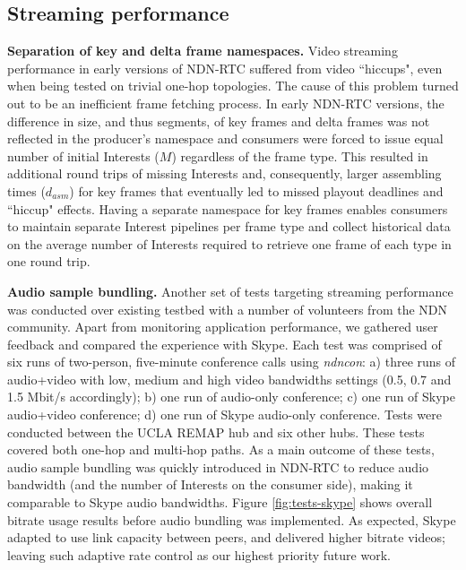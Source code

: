 \documentclass{icn/sig-alternate-2013} %
\newcommand{\ndnrtcName}{NDN-RTC} %
\newcommand{\ndnconName}{\emph{ndncon}}
\begin{document}
\subsection{Streaming performance}

\textbf{Separation of key and delta frame namespaces.} Video streaming performance in early versions of \ndnrtcName{} suffered from video ``hiccups", even when being tested on trivial one-hop topologies. The cause of this problem turned out to be an inefficient frame fetching process.
 In early \ndnrtcName{} versions, the difference in size, and thus segments, of key frames and delta frames was not reflected in the producer's namespace and consumers were forced to issue equal number of initial Interests ($M$) regardless of the frame type. This resulted in additional round trips of missing Interests and, consequently, larger assembling times ($d_{asm}$) for key frames that eventually led to missed playout deadlines and ``hiccup" effects. Having a separate namespace for key frames enables consumers to maintain separate Interest pipelines per frame type and collect historical data on the average number of Interests required to retrieve one frame of each type in one round trip. 

\textbf{Audio sample bundling.}
Another set of tests targeting streaming performance was conducted over existing testbed with a number of volunteers from the NDN community. Apart from monitoring application performance, we gathered user feedback and compared the experience with Skype. 
Each test was comprised of six runs of two-person, five-minute conference calls using \ndnconName{}: a) three runs of audio+video with low, medium and high video bandwidths settings (0.5, 0.7 and 1.5 Mbit/s accordingly); b) one run of audio-only conference; c) one run of Skype audio+video conference; d) one run of Skype audio-only conference. Tests were conducted between the UCLA REMAP hub and six other hubs. These tests covered both one-hop and multi-hop paths. 
As a main outcome of these tests, audio sample bundling was quickly introduced in \ndnrtcName{} to reduce audio bandwidth (and the number of Interests on the consumer side), making it comparable to Skype audio bandwidths. Figure \ref{fig:tests-skype} shows overall bitrate usage results before audio bundling was implemented. As expected, Skype adapted to use link capacity between peers, and delivered higher bitrate videos; leaving such adaptive rate control as our highest priority future work. %
\end{document}
